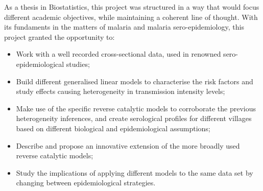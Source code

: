 As a thesis in Biostatistics, this project was structured in a way that would focus different academic objectives, while maintaining a coherent line of thought.
With its fundaments in the matters of malaria and malaria sero-epidemiology, this project granted the opportunity to:
\begin{itemize}
\item Work with a well recorded cross-sectional data, used in renowned sero-epidemiological studies;
\item Build different generalised linear models to characterise the risk factors and study effects causing heterogeneity in transmission intensity levels;
\item Make use of the specific reverse catalytic models to corroborate the previous heterogeneity inferences, and create serological profiles for different villages based on different biological and epidemiological assumptions;
\item Describe and propose an innovative extension of the more broadly used reverse catalytic models;
\item Study the implications of applying different models to the same data set by changing between epidemiological strategies.
\end{itemize}

